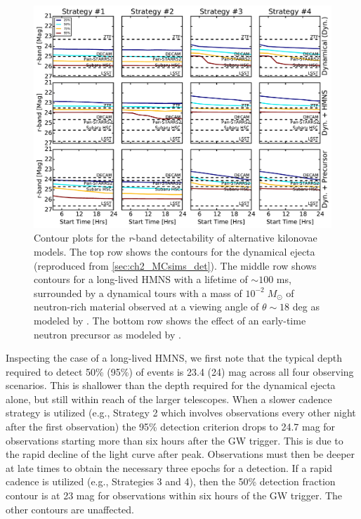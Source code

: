 \begin{figure}[t!]
\centering
\includegraphics[width=\textwidth]{./figs/chapter2/ch2_f19.pdf}
\caption{Contour plots for the {\em r}-band detectability of alternative kilonovae models. The top row shows the contours for the dynamical ejecta (reproduced from \cref{sec:ch2_MCsims_det}). The middle row shows contours for a long-lived HMNS with a lifetime of $\sim 100$ ms, surrounded by a dynamical tours with a mass of $10^{-2}\;M_{\odot}$  of neutron-rich material observed at a viewing angle of $\theta \sim 18$ deg as modeled by \citet{Kasen+15}. The bottom row shows the effect of an early-time neutron precursor as modeled by \citet{Metzger+15}.}
\label{fig:ch2_altdet}
\end{figure}

Inspecting the case of a long-lived HMNS, we first note that the typical depth required to detect 50\% (95\%) of events is 23.4 (24) mag across all four observing scenarios. This is shallower than the depth required for the dynamical ejecta alone, but still within reach of the larger telescopes. When a slower cadence strategy is utilized (e.g., Strategy 2 which involves observations every other night after the first observation) the 95\% detection criterion drops to 24.7 mag for observations starting more than six hours after the GW trigger. This is due to the rapid decline of the light curve after peak. Observations must then be deeper at late times to obtain the necessary three epochs for a detection. If a rapid cadence is utilized (e.g., Strategies 3 and 4), then the 50\% detection fraction contour is at 23 mag for observations within six hours of the GW trigger. The other contours are unaffected.

